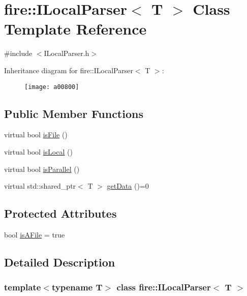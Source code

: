 \hypertarget{a00800}{}\section{fire\+:\+:I\+Local\+Parser$<$ T $>$ Class Template Reference}
\label{a00800}


{\ttfamily \#include $<$I\+Local\+Parser.\+h$>$}

Inheritance diagram for fire\+:\+:I\+Local\+Parser$<$ T $>$\+:\begin{figure}[H]
\begin{center}
\leavevmode
\texttt{[image: a00800]}
\end{center}
\end{figure}
\subsection*{Public Member Functions}
\begin{DoxyCompactItemize}
\item 
virtual bool \hyperlink{a00800_a091d5cf56bf8f407854ef87f460b2958}{is\+File} ()
\item 
virtual bool \hyperlink{a00800_a770acae6e216de3a9c7140a12de25d58}{is\+Local} ()
\item 
virtual bool \hyperlink{a00800_ad46898c516adcce38acbb4800dc9777b}{is\+Parallel} ()
\item 
virtual std\+::shared\+\_\+ptr$<$ T $>$ \hyperlink{a00800_a0fc1446d106f0ab8daf8744a4bd29a65}{get\+Data} ()=0
\end{DoxyCompactItemize}
\subsection*{Protected Attributes}
\begin{DoxyCompactItemize}
\item 
bool \hyperlink{a00800_a39adf288ae0bc79cf39fd6e4638858cf}{is\+A\+File} = true
\end{DoxyCompactItemize}


\subsection{Detailed Description}
\subsubsection*{template$<$typename T$>$\newline
class fire\+::\+I\+Local\+Parser$<$ T $>$}

